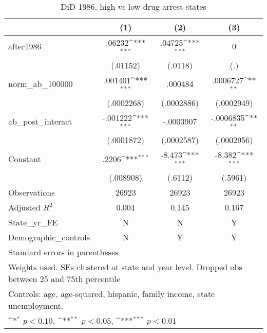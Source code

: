 \begin{table}[htbp]\centering
\def\sym#1{\ifmmode^{#1}\else\(^{#1}\)\fi}
\caption{DiD 1986, high vs low drug arrest states}
\begin{tabular}{l*{3}{c}}
\hline\hline
                    &\multicolumn{1}{c}{(1)}         &\multicolumn{1}{c}{(2)}         &\multicolumn{1}{c}{(3)}         \\
\hline
after1986           &      .06232\sym{***}&      .04725\sym{***}&           0         \\
                    &    (.01152)         &     (.0118)         &         (.)         \\
[1em]
norm\_ab\_100000      &     .001401\sym{***}&     .000484         &    .0006727\sym{**} \\
                    &  (.0002268)         &  (.0002886)         &  (.0002949)         \\
[1em]
ab\_post\_interact    &    -.001222\sym{***}&   -.0003907         &   -.0006835\sym{**} \\
                    &  (.0001872)         &  (.0002587)         &  (.0002956)         \\
[1em]
Constant            &       .2206\sym{***}&      -8.473\sym{***}&      -8.382\sym{***}\\
                    &   (.008908)         &     (.6112)         &     (.5961)         \\
\hline
Observations        &       26923         &       26923         &       26923         \\
Adjusted \(R^{2}\)  &       0.004         &       0.145         &       0.167         \\
State\_yr\_FE         &           N         &           N         &           Y         \\
Demographic\_controls&           N         &           Y         &           Y         \\
\hline\hline
\multicolumn{4}{l}{\footnotesize Standard errors in parentheses}\\
\multicolumn{4}{l}{\footnotesize Weights used. SEs clustered at state and year level. Dropped obs between 25 and 75th percentile}\\
\multicolumn{4}{l}{\footnotesize Controls: age, age-squared, hispanic, family income, state unemployment.}\\
\multicolumn{4}{l}{\footnotesize \sym{*} \(p<0.10\), \sym{**} \(p<0.05\), \sym{***} \(p<0.01\)}\\
\end{tabular}
\end{table}
